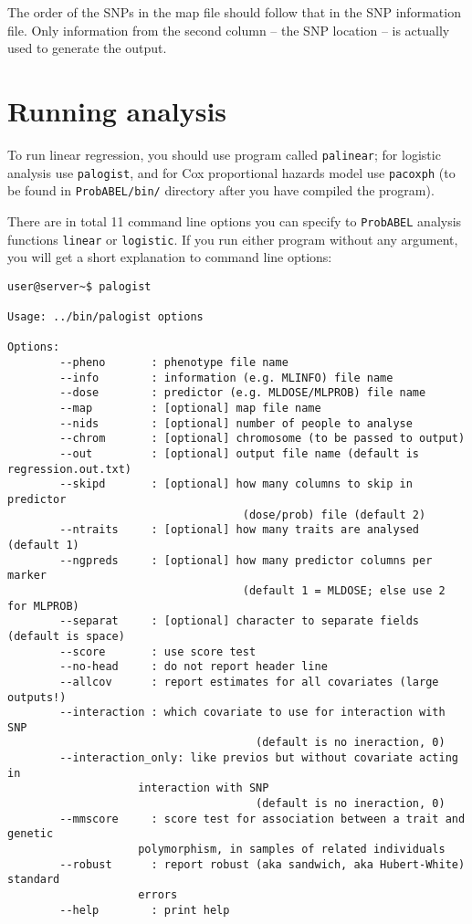 \documentclass[12pt]{article}
\begin{document}


The order of the SNPs in the map file should follow that in the SNP information 
file. Only information from the second column -- the SNP location -- is 
actually used to generate the output.

\section{Running analysis}

To run linear regression, you should use program called \texttt{palinear};
for logistic analysis use \texttt{palogist}, and for Cox proportional 
hazards model use \texttt{pacoxph} (to be found in 
\texttt{ProbABEL/bin/} directory after you have compiled the program).

There are in total 11 command line options you can specify to \texttt{ProbABEL} 
analysis functions \texttt{linear} or \texttt{logistic}. If you run 
either program without any argument, you 
will get a short explanation to command line options:

\begin{verbatim}
user@server~$ palogist

Usage: ../bin/palogist options

Options:
		--pheno       : phenotype file name
		--info        : information (e.g. MLINFO) file name
		--dose        : predictor (e.g. MLDOSE/MLPROB) file name
		--map         : [optional] map file name
		--nids        : [optional] number of people to analyse
		--chrom       : [optional] chromosome (to be passed to output)
		--out         : [optional] output file name (default is regression.out.txt)
		--skipd       : [optional] how many columns to skip in predictor
								    (dose/prob) file (default 2)
		--ntraits     : [optional] how many traits are analysed (default 1)
		--ngpreds     : [optional] how many predictor columns per marker
								    (default 1 = MLDOSE; else use 2 for MLPROB)
		--separat     : [optional] character to separate fields (default is space)
		--score       : use score test
		--no-head     : do not report header line
		--allcov      : report estimates for all covariates (large outputs!)
		--interaction : which covariate to use for interaction with SNP
									  (default is no ineraction, 0)
		--interaction_only: like previos but without covariate acting in
                    interaction with SNP
									  (default is no ineraction, 0)
		--mmscore     : score test for association between a trait and genetic
                    polymorphism, in samples of related individuals	
		--robust      : report robust (aka sandwich, aka Hubert-White) standard 
                    errors
		--help        : print help

\end{verbatim}
\end{document}

